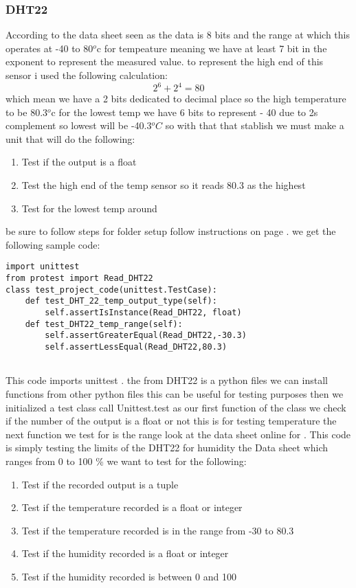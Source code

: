 \subsubsection{DHT22}
According to the  data sheet \cite{sparkfun} seen as  the data is   8 bits  and  the  range at which this   operates at  -40 to 80$^{o}$c for tempeature
meaning we have  at least  7 bit in the  exponent to  represent  the   measured value.
to represent  the  high  end of this  sensor i used the  following calculation:
$$ 2^6 +2^4 = 80$$ which mean  we have  a 2 bits dedicated to decimal place so the  high temperature to be 80.3$^{o}$c
for the  lowest temp we have 6 bits  to  represent  - 40 due to  2s complement  so lowest  will   be -40.3$^{o}C$
so with that  that  stablish we  must  make a  unit  that will do  the  following:
\begin{enumerate}
    \item Test if the  output is  a float
    \item Test the  high end of  the  temp sensor so it  reads  80.3 as  the highest
    \item Test for the  lowest   temp   around 
\end{enumerate}
be sure to follow  steps  for  folder  setup  follow instructions on page \pageref{folderstructure}.
we get the following sample code:
\begin{lstlisting}[style=mystyle,caption={sample test intial code}]
import unittest
from protest import Read_DHT22
class test_project_code(unittest.TestCase):
    def test_DHT_22_temp_output_type(self):
        self.assertIsInstance(Read_DHT22, float)
    def test_DHT22_temp_range(self):
        self.assertGreaterEqual(Read_DHT22,-30.3)
        self.assertLessEqual(Read_DHT22,80.3)
    
\end{lstlisting} 
This code imports unittest . the from DHT22 is  a python files  we can  install  functions from other python files this can be useful for testing purposes
then we initialized a test class call Unittest.test as our first function of the class  we  check if the number of the output  is a float or not this is  for  testing  temperature
the next function we test for  is the range look at the data sheet online  for . This code is  simply testing the  limits of the  DHT22
for  humidity  the Data sheet which ranges from 0 to 100 \%
we want to test for the following:
\begin{enumerate}
    \item Test if the recorded output is a tuple
    \item Test if the temperature recorded  is a float or  integer
    \item Test if the temperature recorded is  in the  range from -30 to 80.3
    \item Test if the humidity recorded is  a  float or  integer
    \item Test if the humidity recorded is  between 0 and 100
\end{enumerate}
